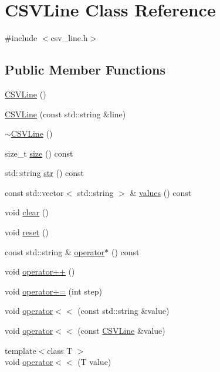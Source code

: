 \hypertarget{classCSVLine}{}\section{C\+S\+V\+Line Class Reference}
\label{classCSVLine}


{\ttfamily \#include $<$csv\+\_\+line.\+h$>$}

\subsection*{Public Member Functions}
\begin{DoxyCompactItemize}
\item 
\hyperlink{classCSVLine_a214a1f482627575b7c0defae2b048aa8}{C\+S\+V\+Line} ()
\item 
\hyperlink{classCSVLine_ae1370b48c447e55096bf0d6ce752df79}{C\+S\+V\+Line} (const std\+::string \&line)
\item 
\hyperlink{classCSVLine_a5d894d71fb45d4cbe9af2dd16b408327}{$\sim$\+C\+S\+V\+Line} ()
\item 
size\+\_\+t \hyperlink{classCSVLine_a55e47580ee57f802e8ea4d65217a0b23}{size} () const 
\item 
std\+::string \hyperlink{classCSVLine_af5825b91bf1329850b4ed00acd78342a}{str} () const 
\item 
const std\+::vector$<$ std\+::string $>$ \& \hyperlink{classCSVLine_ab7f413beb00cf9d629a56e655a469f13}{values} () const 
\item 
void \hyperlink{classCSVLine_a1ff1445feeccd9a8204b4f2aedd861db}{clear} ()
\item 
void \hyperlink{classCSVLine_a0db6daf70aff9d129d671bc174db3482}{reset} ()
\item 
const std\+::string \& \hyperlink{classCSVLine_ae0666050b9bf951381a35fdd3a8801c8}{operator$\ast$} () const 
\item 
void \hyperlink{classCSVLine_aaebd8997d214a37100ab4e37d480c919}{operator++} ()
\item 
void \hyperlink{classCSVLine_a344f8c4600145c55576f622c486c9a7c}{operator+=} (int step)
\item 
void \hyperlink{classCSVLine_aa12fa76a2dcfc65a9074acb51c0a9f8a}{operator$<$$<$} (const std\+::string \&value)
\item 
void \hyperlink{classCSVLine_a99f350267be73311e64c43a3fe5b6e0b}{operator$<$$<$} (const \hyperlink{classCSVLine}{C\+S\+V\+Line} \&value)
\item 
{\footnotesize template$<$class T $>$ }\\void \hyperlink{classCSVLine_aef4dd2108bd5cf556992629d6eaa08e6}{operator$<$$<$} (T value)

\end{DoxyCompactItemize}
